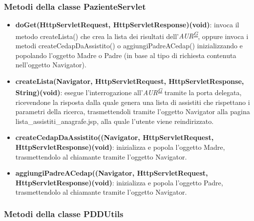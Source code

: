\documentclass[a4paper]{article}
\begin{document}
\subsubsection{Metodi della classe PazienteServlet}

\begin{itemize}
	\item \textbf{doGet(HttpServletRequest, HttpServletResponse)(void)}: invoca il metodo createLista() che crea la lista dei risultati dell'\textit{AUR\textsuperscript{\hyperref[sec:gl]{G}}}, oppure invoca i metodi createCedapDaAssistito() o aggiungiPadreACedap() inizializzando e popolando l'oggetto Madre o Padre (in base al tipo di richiesta contenuta nell'oggetto Navigator).
    \item \textbf{createLista(Navigator, HttpServletRequest, HttpServletResponse, String)(void)}: esegue l'interrogazione all'\textit{AUR\textsuperscript{\hyperref[sec:gl]{G}}} tramite la porta delegata, ricevendone la risposta dalla quale genera una lista di assistiti che rispettano i parametri della ricerca, trasmettendoli tramite l'oggetto Navigator alla pagina lista\_assistiti\_anagrafe.jsp, alla quale l'utente viene reindirizzato.
	\item \textbf{createCedapDaAssistito((Navigator, HttpServletRequest, HttpServletResponse)(void)}: inizializza e popola l'oggetto Madre, trasmettendolo al chiamante tramite l'oggetto Navigator.
	\item \textbf{aggiungiPadreACedap((Navigator, HttpServletRequest, HttpServletResponse)(void)}: inizializza e popola l'oggetto Padre, trasmettendolo al chiamante tramite l'oggetto Navigator.
\end{itemize}

\subsubsection{Metodi della classe PDDUtils}
\end{document}
